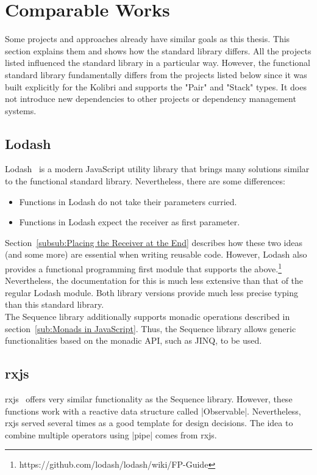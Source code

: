 \section{Comparable Works} %
\label{sec:Comparable Works}
Some projects and approaches already have similar goals as this thesis. This
section explains them and shows how the standard library differs. All the
projects listed influenced the standard library in a particular way. However,
the functional standard library fundamentally differs from the projects listed
below since it was built explicitly for the Kolibri and supports the "Pair" and
"Stack" types. It does not introduce new dependencies to other projects or
dependency management systems.

\subsection{Lodash} %
\label{sub:Lodash}
Lodash~\cite{lodash_2023} is a modern JavaScript utility library that brings many solutions
similar to the functional standard library. Nevertheless, there are some differences:
\begin{itemize}
  \item Functions in Lodash do not take their parameters curried.
  \item Functions in Lodash expect the receiver as first parameter.
\end{itemize}
Section~\ref{subsub:Placing the Receiver at the End} describes how these two
ideas (and some more) are essential when writing reusable code. However, Lodash
also provides a functional programming first module that supports the
above.\footnote{https://github.com/lodash/lodash/wiki/FP-Guide}
Nevertheless, the documentation for this is much less extensive than that of
the regular Lodash module. Both library versions provide much less precise
typing than this standard library.\\
The Sequence library additionally supports monadic operations described in
section~\ref{sub:Monads in JavaScript}. Thus, the Sequence
library allows generic functionalities based on the monadic API, such as JINQ,
to be used.

\subsection{rxjs} %
\label{sub:rxjs}
rxjs~\cite{rxjs_2023} offers very similar functionality as the Sequence library.
However, these functions work with a reactive data structure called
|Observable|. Nevertheless, rxjs served several times as a good template for
design decisions. The idea to combine multiple operators using |pipe| comes
from rxjs.

